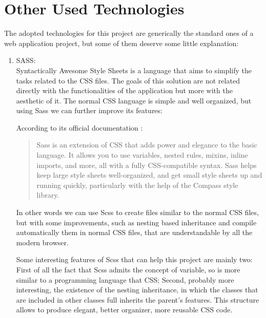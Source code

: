  
\section{Other Used Technologies}

The adopted technologies for this project are generically the standard ones of a web application project, but some of them deserve some little explanation:

\begin{enumerate}

\item
SASS:
\\
\noindent
Syntactically Awesome Style Sheets is a language that aims to simplify the tasks related to the CSS files. The goals of this solution are not related directly with the functionalities of the application but more with the aesthetic of it.
The normal CSS language is simple and well organized, but using Sass we can further improve its features:

According to its official documentation :
\begin{quote}
Sass is an extension of CSS that adds power and elegance to the basic language. It allows you to use variables, nested rules, mixins, inline imports, and more, all with a fully CSS-compatible syntax. Sass helps keep large style sheets well-organized, and get small style sheets up and running quickly, particularly with the help of the Compass style library.

\end{quote}

In other words we can use Scss to create files similar to the normal CSS files, but with some improvements, such as nesting based inheritance and compile automatically them in normal CSS files, that are understandable by all the modern browser.

Some interesting features of Scss that can help this project are mainly two:
First of all the fact that Scss admits the concept of variable, so is more similar to a programming language that CSS; Second, probably more interesting, the existence of the nesting inheritance, in which the classes that are included in other classes full inherits the parent's features. This structure allows to produce elegant, better organizer, more reusable CSS code.


\end{enumerate}
